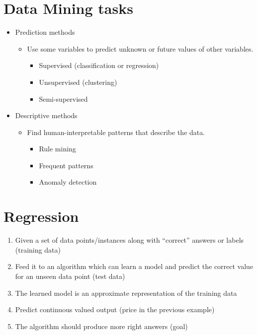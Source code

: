 \section{Data Mining tasks}
\begin{itemize}
    \item Prediction methods
    \begin{itemize}
        \item Use some variables to predict unknown or future values of other variables.
        \begin{itemize}
            \item Supervised (classification or regression)
            \item Unsupervised (clustering)
            \item Semi-supervised
        \end{itemize}
    \end{itemize}
    \item Descriptive methods
    \begin{itemize}
        \item Find human-interpretable patterns that describe the data.
        \begin{itemize}
            \item Rule mining
            \item Frequent patterns
            \item Anomaly detection
        \end{itemize}
    \end{itemize}
\end{itemize}

\section{Regression}
\begin{enumerate}
    \item Given a set of data points/instances along with “correct” answers or 
    labels (training data)
    \item Feed it to an algorithm which can learn a model and predict the 
    correct value for an unseen data point (test data)
    \item The learned model is an approximate representation of the training 
    data
    \item Predict continuous valued output (price in the previous example)
    \item The algorithm should produce more right answers (goal)
\end{enumerate}

